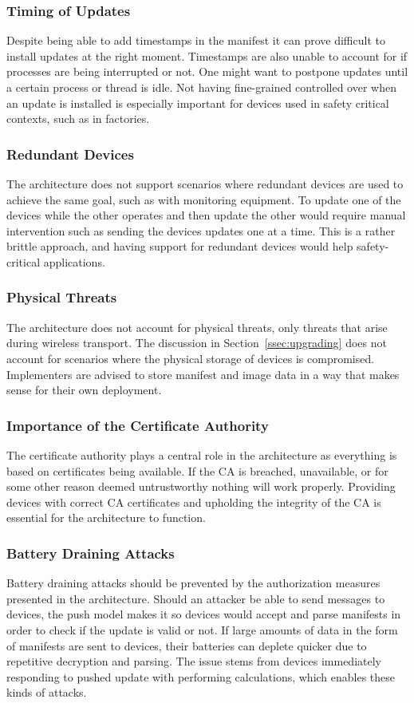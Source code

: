 \documentclass[0-thesis.tex]{subfiles}
\begin{document}
\subsubsection{Timing of Updates}
Despite being able to add timestamps in the manifest it can prove difficult to install
updates at the right moment. Timestamps are also unable to account for if processes are
being interrupted or not. One might want to postpone updates until a certain process or
thread is idle. Not having fine-grained controlled over when an update is installed is
especially important for devices used in safety critical contexts, such as in factories.

\subsubsection{Redundant Devices}
The architecture does not support scenarios where redundant devices are used to achieve
the same goal, such as with monitoring equipment. To update one of the devices while the other
operates and then update the other would require manual intervention such as sending the
devices updates one at a time. This is a rather brittle approach, and having support for
redundant devices would help safety-critical applications.

\subsubsection{Physical Threats}
The architecture does not account for physical threats, only threats that arise during
wireless transport. The discussion in Section~\ref{ssec:upgrading} does not account for
scenarios where the physical storage of devices is compromised. Implementers are advised
to store manifest and image data in a way that makes sense for their own deployment.

\subsubsection{Importance of the Certificate Authority}
The certificate authority plays a central role in the architecture as everything is based
on certificates being available. If the CA is breached, unavailable, or for some other
reason deemed untrustworthy nothing will work properly. Providing devices with correct CA
certificates and upholding the integrity of the CA is essential for the architecture to
function.

\subsubsection{Battery Draining Attacks}
Battery draining attacks should be prevented by the authorization measures presented in
the architecture. Should an attacker be able to send messages to devices, the push model
makes it so devices would accept and parse manifests in order to check if the update is
valid or not. If large amounts of data in the form of manifests are sent to devices, their
batteries can deplete quicker due to repetitive decryption and parsing. The issue stems
from devices immediately responding to pushed update with performing calculations, which
enables these kinds of attacks.
\end{document}
